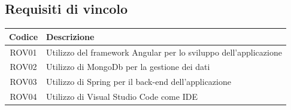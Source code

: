\subsection{Requisiti di vincolo}
\begin{center}
	\begin{tabularx}{\textwidth}{|c|X|}
		\hline
		\textbf{Codice} & \textbf{Descrizione} \\
		\hline
		ROV01 & Utilizzo del framework Angular per lo sviluppo dell'applicazione\\
		\hline
		ROV02 & Utilizzo di MongoDb per la gestione dei dati\\
		\hline
		ROV03 & Utilizzo di Spring per il back-end
		dell'applicazione\\
		\hline
		ROV04 & Utilizzo di Visual Studio Code come \gls{IDE}\\
		\hline
	\end{tabularx}
\end{center}



